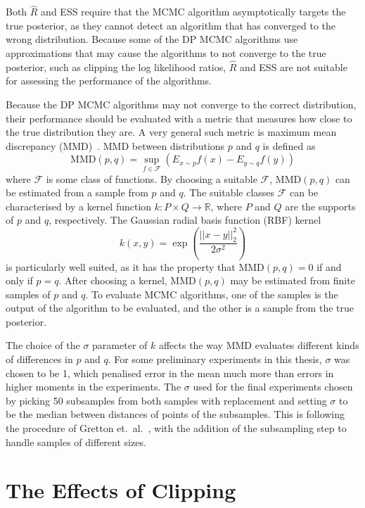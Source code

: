 \documentclass[english,twoside,openright]{HYgraduMLDS}
\newcommand{\R}{\mathbb{R}}
\begin{document}
Both \(\hat{R}\) and ESS require that the MCMC algorithm asymptotically targets 
the true posterior, as they cannot detect an algorithm that has converged to the 
wrong distribution. Because some of the DP MCMC algorithms use approximations 
that may cause the algorithms to not converge to the true posterior, 
such as clipping the log likelihood ratios, \(\hat{R}\) and ESS are not suitable 
for assessing the performance of the algorithms.

Because the DP MCMC algorithms may not converge to the correct distribution, 
their performance should be evaluated with a metric that measures how close 
to the true distribution they are. A very general such metric is maximum mean
discrepancy (MMD)~\cite{GrettonBRSS12}. MMD between distributions \(p\) and \(q\) 
is defined as 
\[
    \mathrm{MMD}(p, q) = \sup_{f\in \mathcal{F}}(E_{x\sim p}f(x) - E_{y\sim q}f(y))
\]
where \(\mathcal{F}\) is some class of functions. By 
choosing a suitable \(\mathcal{F}\), \(\mathrm{MMD}(p, q)\) can be estimated from a 
sample from \(p\) and \(q\). The suitable classes \(\mathcal{F}\) can be 
characterised by a kernel function \(k\colon P\times Q \to \R\), where 
\(P\) and \(Q\) are the supports of \(p\) and \(q\), respectively.
The Gaussian radial basis function (RBF) kernel 
\[
    k(x, y) = \exp\left(\frac{||x - y||_2^2}{2\sigma^2}\right)
\]
is particularly well suited, as it has the property that 
\(\mathrm{MMD}(p, q) = 0\) if and only if \(p = q\). After choosing a kernel,
\(\mathrm{MMD}(p, q)\) may be estimated from finite samples of \(p\) and \(q\).
To evaluate MCMC algorithms, one of the samples is the output of the algorithm 
to be evaluated, and the other is a sample from the true posterior.

The choice of the \(\sigma\) parameter of \(k\) affects the way MMD evaluates 
different kinds of differences in \(p\) and \(q\). For some preliminary experiments
in this thesis, \(\sigma\) was chosen to be 1, which penalised error in the 
mean much more than errors in higher moments in the experiments. 
The \(\sigma\) used for the final experiments chosen by picking 50 subsamples 
from both samples with replacement and setting \(\sigma\) to be the median 
between distances of points of the subsamples. This is following the procedure of 
Gretton et.\ al.~\cite{GrettonBRSS12}, with the addition of the subsampling step 
to handle samples of different sizes.

\section{The Effects of Clipping}
\end{document}
